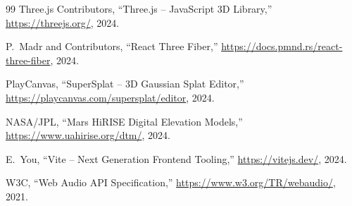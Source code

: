 \documentclass[12pt,a4paper]{report}
\begin{document}
\begin{thebibliography}{99}
Three.js Contributors, ``Three.js -- JavaScript 3D Library,'' \url{https://threejs.org/}, 2024.

P.~Madr and Contributors, ``React Three Fiber,'' \url{https://docs.pmnd.rs/react-three-fiber}, 2024.

PlayCanvas, ``SuperSplat -- 3D Gaussian Splat Editor,'' \url{https://playcanvas.com/supersplat/editor}, 2024.

NASA/JPL, ``Mars HiRISE Digital Elevation Models,'' \url{https://www.uahirise.org/dtm/}, 2024.

E.~You, ``Vite -- Next Generation Frontend Tooling,'' \url{https://vitejs.dev/}, 2024.

W3C, ``Web Audio API Specification,'' \url{https://www.w3.org/TR/webaudio/}, 2021.

\end{thebibliography}
\end{document}
